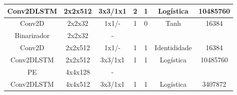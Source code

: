 \begin{table}[htbp]
\begin{adjustbox}{width=\columnwidth,center}
\begin{tabular}{|c|c|c|c|c|c|c|}
			Conv2DLSTM      & 2x2x512                                                              & 3x3/1x1                                                                                 & 2              & 1                  & Logística                                                               & 10485760                                                                \\ \hline
			Conv2D          & 2x2x32                                                               & 1x1/-                                                                                   & 1              & 0                 & Tanh                                                                  & 16384                                                                   \\ \hline
			Binarizador     & 2x2x32                                                               & -                                                                                       &                &                        &                                                                       &                                                                         \\ \hline
			Conv2D          & 2x2x512                                                              & 1x1/-                                                                                   & 1              & 1                  & Identididade                                                          & 16384                                                                   \\ \hline
			Conv2DLSTM      & 2x2x512                                                              & 3x3/1x1                                                                                 & 1              & 1                  & Logística                                                               & 10485760                                                                \\ \hline
			PE             & 4x4x128                                                              & -                                                                                       &                &                        &                                                                       &                                                                         \\ \hline
			Conv2DLSTM      & 4x4x512                                                              & 3x3/1x1                                                                                 & 1              & 1                  & Logística                                                               & 3407872                                                                 \\ \hline

\end{tabular}
\end{adjustbox}
\end{table}
